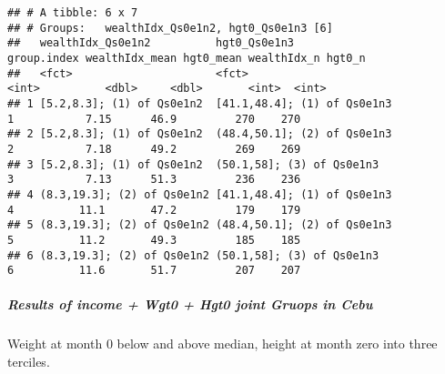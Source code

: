 \documentclass[
]{article}
\newenvironment{Shaded}{\begin{snugshade}}{\end{snugshade}}
\newcommand{\CommentTok}[1]{\textcolor[rgb]{0.56,0.35,0.01}{\textit{#1}}}
\newcommand{\DataTypeTok}[1]{\textcolor[rgb]{0.13,0.29,0.53}{#1}}
\newcommand{\DecValTok}[1]{\textcolor[rgb]{0.00,0.00,0.81}{#1}}
\newcommand{\FloatTok}[1]{\textcolor[rgb]{0.00,0.00,0.81}{#1}}
\newcommand{\KeywordTok}[1]{\textcolor[rgb]{0.13,0.29,0.53}{\textbf{#1}}}
\newcommand{\NormalTok}[1]{#1}
\newcommand{\OperatorTok}[1]{\textcolor[rgb]{0.81,0.36,0.00}{\textbf{#1}}}
\newcommand{\OtherTok}[1]{\textcolor[rgb]{0.56,0.35,0.01}{#1}}
\newcommand{\StringTok}[1]{\textcolor[rgb]{0.31,0.60,0.02}{#1}}
\begin{document}
\begin{verbatim}
## # A tibble: 6 x 7
## # Groups:   wealthIdx_Qs0e1n2, hgt0_Qs0e1n3 [6]
##   wealthIdx_Qs0e1n2          hgt0_Qs0e1n3                group.index wealthIdx_mean hgt0_mean wealthIdx_n hgt0_n
##   <fct>                      <fct>                             <int>          <dbl>     <dbl>       <int>  <int>
## 1 [5.2,8.3]; (1) of Qs0e1n2  [41.1,48.4]; (1) of Qs0e1n3           1           7.15      46.9         270    270
## 2 [5.2,8.3]; (1) of Qs0e1n2  (48.4,50.1]; (2) of Qs0e1n3           2           7.18      49.2         269    269
## 3 [5.2,8.3]; (1) of Qs0e1n2  (50.1,58]; (3) of Qs0e1n3             3           7.13      51.3         236    236
## 4 (8.3,19.3]; (2) of Qs0e1n2 [41.1,48.4]; (1) of Qs0e1n3           4          11.1       47.2         179    179
## 5 (8.3,19.3]; (2) of Qs0e1n2 (48.4,50.1]; (2) of Qs0e1n3           5          11.2       49.3         185    185
## 6 (8.3,19.3]; (2) of Qs0e1n2 (50.1,58]; (3) of Qs0e1n3             6          11.6       51.7         207    207
\end{verbatim}

\hypertarget{results-of-income-wgt0-hgt0-joint-gruops-in-cebu}{%
\subparagraph{Results of income + Wgt0 + Hgt0 joint Gruops in
Cebu}\label{results-of-income-wgt0-hgt0-joint-gruops-in-cebu}}

Weight at month 0 below and above median, height at month zero into
three terciles.

\begin{Shaded}
\end{Shaded}
\end{document}
